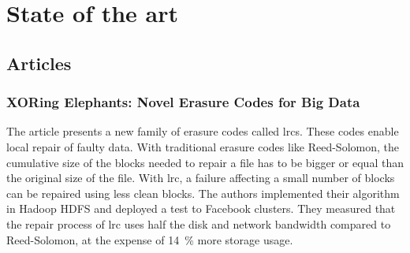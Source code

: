 \chapter{State of the art}

\section{Articles}

\subsection{XORing Elephants: Novel Erasure Codes for Big Data \autocite{XorbasVLDB}}

The article presents a new family of erasure codes called \acp{lrc}.
These codes enable local repair of faulty data.
With traditional erasure codes like Reed-Solomon, the cumulative size of the blocks needed to repair a file has to be bigger or equal than the original size of the file.
With \ac{lrc}, a failure affecting a small number of blocks can be repaired using less clean blocks.
The authors implemented their algorithm in Hadoop HDFS and deployed a test to Facebook clusters.
They measured that the repair process of \ac{lrc} uses half the disk and network bandwidth compared to Reed-Solomon, at the expense of \SI{14}{\percent} more storage usage.
